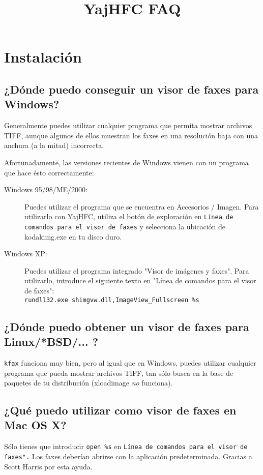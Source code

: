 \documentclass[a4paper,10pt]{scrartcl}
\title{YajHFC FAQ}
\author{}
\date{}
\begin{document}
\maketitle

\tableofcontents

\section{Instalación}
\subsection{¿Dónde puedo conseguir un visor de faxes para Windows?}

Generalmente puedes utilizar cualquier programa que permita mostrar archivos TIFF, aunque algunos de ellos muestran los faxes en una resolución baja con una anchura (a la mitad) incorrecta.

Afortunadamente, las versiones recientes de Windows vienen con un programa 
que hace ésto correctamente:

\begin{description}
\item[Windows 95/98/ME/2000:]
Puedes utilizar el programa que se encuentra en Accesorios / Imagen. 
Para utilizarlo con YajHFC, utiliza el botón de exploración en \texttt{Línea de comandos 
para el visor de faxes} y selecciona la ubicación de kodakimg.exe en tu disco duro.

\item[Windows XP:]
Puedes utilizar el programa integrado "Visor de imágenes y faxes". 
Para utilizarlo, introduce el siguiente texto en "Línea de comandos para el visor de faxes":\\
      \verb#rundll32.exe shimgvw.dll,ImageView_Fullscreen %s#
 \end{description}

      
\subsection{¿Dónde puedo obtener un visor de faxes para Linux/*BSD/... ?}
\texttt{kfax} funciona muy bien, pero al igual que en Windows, puedes utilizar cualquier programa que pueda mostrar archivos TIFF, tan sólo busca en la base de paquetes de tu distribución (xloadimage \emph{no} funciona).


\subsection{¿Qué puedo utilizar como visor de faxes en Mac OS X?}
Sólo tienes que introducir \verb#open %s# en \texttt{Línea de comandos para el visor de faxes".}
Los faxes deberían abrirse con la aplicación predeterminada. 
Gracias a Scott Harris por esta ayuda.
\end{document}
